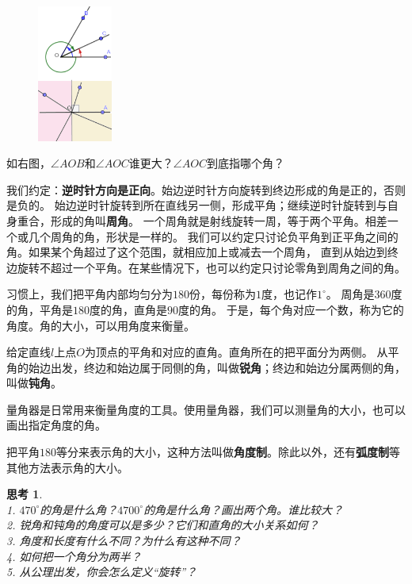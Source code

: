 \documentclass[12pt,UTF8]{ctexbook}
\newtheorem{sk}{思考}[section]
\begin{document}
\begin{figure} %
    \vspace{-10pt}
    \includegraphics[width=0.22\textwidth]{角度1.png}
\end{figure}

如右图，$\angle AOB$和$\angle AOC$谁更大？$\angle AOC$到底指哪个角？

我们约定：\textbf{逆时针方向是正向}。始边逆时针方向旋转到终边形成的角是正的，否则是负的。
始边逆时针旋转到所在直线另一侧，形成平角；继续逆时针旋转到与自身重合，形成的角叫\textbf{周角}。
一个周角就是射线旋转一周，等于两个平角。相差一个或几个周角的角，形状是一样的。
我们可以约定只讨论负平角到正平角之间的角。如果某个角超过了这个范围，就相应加上或减去一个周角，
直到从始边到终边旋转不超过一个平角。在某些情况下，也可以约定只讨论零角到周角之间的角。

习惯上，我们把平角内部均匀分为$180$份，每份称为$1$度，也记作$1^\circ$。
周角是$360$度的角，平角是$180$度的角，直角是$90$度的角。
于是，每个角对应一个数，称为它的角度。角的大小，可以用角度来衡量。

给定直线$l$上点$O$为顶点的平角和对应的直角。直角所在的把平面分为两侧。
从平角的始边出发，终边和始边属于同侧的角，叫做\textbf{锐角}；终边和始边分属两侧的角，叫做\textbf{钝角}。

量角器是日常用来衡量角度的工具。使用量角器，我们可以测量角的大小，也可以画出指定角度的角。

把平角$180$等分来表示角的大小，这种方法叫做\textbf{角度制}。除此以外，还有\textbf{弧度制}等其他方法表示角的大小。
\begin{sk}\label{sk:0-2-0}
    \mbox{}\\
    1. $470^\circ$的角是什么角？$4700^\circ$的角是什么角？画出两个角。谁比较大？\\
    2. 锐角和钝角的角度可以是多少？它们和直角的大小关系如何？\\
    3. 角度和长度有什么不同？为什么有这种不同？\\
    4. 如何把一个角分为两半？\\
    5. 从公理出发，你会怎么定义“旋转”？
\end{sk}
\end{document}
